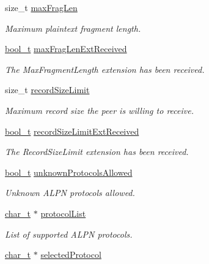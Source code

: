 \begin{DoxyCompactItemize}
size\+\_\+t \hyperlink{struct__TlsContext_a723067597b337a48f497e912fc0dd3d4}{max\+Frag\+Len}
\begin{DoxyCompactList}\small\item\em Maximum plaintext fragment length. \end{DoxyCompactList}\item 
\hyperlink{compiler__port_8h_a812d16e5494522586b3784e55d479912}{bool\+\_\+t} \hyperlink{struct__TlsContext_a777c6fff0557967c0103e15f6fa1f837}{max\+Frag\+Len\+Ext\+Received}
\begin{DoxyCompactList}\small\item\em The Max\+Fragment\+Length extension has been received. \end{DoxyCompactList}\item 
size\+\_\+t \hyperlink{struct__TlsContext_a36ccbeabfa4a3dad22fe9ad2cfa63ab0}{record\+Size\+Limit}
\begin{DoxyCompactList}\small\item\em Maximum record size the peer is willing to receive. \end{DoxyCompactList}\item 
\hyperlink{compiler__port_8h_a812d16e5494522586b3784e55d479912}{bool\+\_\+t} \hyperlink{struct__TlsContext_a900511a047bccf50a2dbb4135022299f}{record\+Size\+Limit\+Ext\+Received}
\begin{DoxyCompactList}\small\item\em The Record\+Size\+Limit extension has been received. \end{DoxyCompactList}\item 
\hyperlink{compiler__port_8h_a812d16e5494522586b3784e55d479912}{bool\+\_\+t} \hyperlink{struct__TlsContext_acb254759769c72f12bc906dca4532ef4}{unknown\+Protocols\+Allowed}
\begin{DoxyCompactList}\small\item\em Unknown A\+L\+PN protocols allowed. \end{DoxyCompactList}\item 
\hyperlink{compiler__port_8h_a40bb5262bf908c328fbcfbe5d29d0201}{char\+\_\+t} $\ast$ \hyperlink{struct__TlsContext_a4162801ce1b87cec59a7130c195b734b}{protocol\+List}
\begin{DoxyCompactList}\small\item\em List of supported A\+L\+PN protocols. \end{DoxyCompactList}\item 
\hyperlink{compiler__port_8h_a40bb5262bf908c328fbcfbe5d29d0201}{char\+\_\+t} $\ast$ \hyperlink{struct__TlsContext_aa3dc99b8cf7df618861aa2a052e0bad9}{selected\+Protocol}

\end{DoxyCompactItemize}
